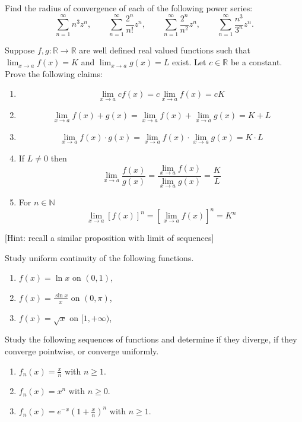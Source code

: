 \documentclass[11pt]{article}%
\begin{document}
\begin{Exercise}[title=**$\dagger$] Find the radius of convergence of each of the following power series: $$\sum_{n=1}^{\infty}n^3z^n,\qquad\sum_{n=1}^{\infty}\frac{2^n}{n!}z^n,\qquad\sum_{n=1}^{\infty}\frac{2^n}{n^2}z^n,\qquad\sum_{n=1}^{\infty}\frac{n^3}{3^n}z^n.$$
\end{Exercise}



\begin{Exercise}[title=**$\dagger$]
	Suppose $f,g:\mathbb R \rightarrow \mathbb R $ are well defined real valued functions such that $\lim_{x\rightarrow a} f(x) =K$ and $\lim_{x\rightarrow a} g(x) = L$ exist. Let $c\in\mathbb R$ be a constant. Prove the following claims: 
	\begin{enumerate}
		\item $$\lim_{x\rightarrow a} cf(x) = c \lim_{x\rightarrow a} f(x) = cK$$
		\item $$\lim_{x\rightarrow a} f(x) + g(x) = \lim_{x \rightarrow a} f(x) + \lim_{x \rightarrow a} g(x) = K+L$$
		\item $$\lim_{x\rightarrow a} f(x) \cdot g(x) = \lim_{x \rightarrow a} f(x) \cdot \lim_{x \rightarrow a} g(x) = K\cdot L$$
		\item If $L\neq0$ then
		$$\lim_{x\rightarrow a} \frac{f(x)}{g(x)} = \frac{\lim_{x \rightarrow a} f(x) }{ \lim_{x \rightarrow a} g(x)} = \frac{K}{L}$$
		\item For $n\in\mathbb{N}$ $$\lim_{x\rightarrow a} [f(x)]^n = [\lim_{x\rightarrow a} f(x)]^n=K^n$$
	\end{enumerate}
	[Hint: recall a similar proposition with limit of sequences]
\end{Exercise}

\begin{Exercise}[title=**$\dagger$]
	Study uniform continuity of the following functions.
	\begin{enumerate}
		\item{$f(x)=\ln x$ on $(0,1)$,}
		\item{$f(x)=\frac{\sin x}{x}$ on $(0,\pi)$,}
		\item{$f(x)=\sqrt x$ on $[1,+\infty)$,}
	\end{enumerate}
\end{Exercise}

\begin{Exercise}[title=**$\dagger$]
	Study the following sequences of functions and determine if they diverge, if they converge pointwise, or converge uniformly.
	\begin{enumerate}
		\item $f_n(x) = \frac{x}{n}$ with $n\geq 1$.
		\item $f_n(x) = x^n$ with $n\geq 0$.
		\item $f_n(x) = e^{-x}\left(1+\frac{x}{n}\right)^{n}$ with $n\geq 1$.
	\end{enumerate}
\end{Exercise}
\end{document}

